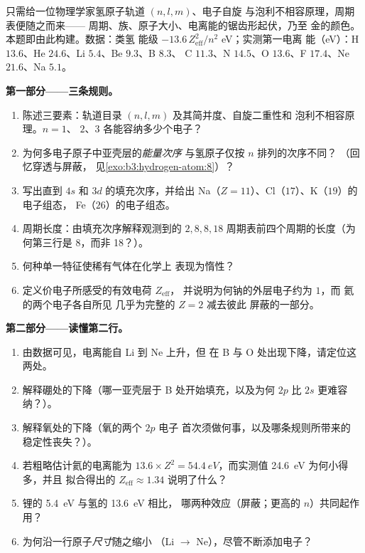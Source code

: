 \begin{problem}\label{pb:b3:identical-particles:1}
只需给一位物理学家氢原子轨道 $(n, l, m)$、电子自旋
与泡利不相容原理，周期表便随之而来——
周期、族、原子大小、电离能的锯齿形起伏，乃至
金的颜色。本题即由此构建。数据：类氢
能级 $-13.6\,Z_{\text{eff}}^2/n^2$ eV；实测第一电离
能（eV）：H $13.6$、He $24.6$、Li $5.4$、Be $9.3$、B $8.3$、
C $11.3$、N $14.5$、O $13.6$、F $17.4$、Ne $21.6$、Na $5.1$。

\medskip\noindent\textbf{第一部分——三条规则。}
\begin{enumerate}
  \item 陈述三要素：轨道目录
        $(n, l, m)$ 及其简并度、自旋二重性和
        泡利不相容原理。$n = 1$、
        $2$、$3$ 各能容纳多少个电子？
  \item 为何多电子原子中亚壳层的\emph{能量次序}
        与氢原子仅按 $n$ 排列的次序不同？
        （回忆穿透与屏蔽，
        见\cref{exo:b3:hydrogen-atom:8}）？
  \item 写出直到 $4s$ 和 $3d$ 的填充次序，并给出
        Na（$Z = 11$）、Cl（$17$）、K（$19$）的电子组态，
        Fe（$26$）的电子组态。
  \item 周期长度：由填充次序解释观测到的 $2, 8, 8, 18$
        周期表前四个周期的长度（为何第三行是
        8，而非 18？）。
  \item 何种单一特征使稀有气体在化学上
        表现为惰性？
  \item 定义价电子所感受的有效电荷 $Z_{\text{eff}}$，
        并说明为何钠的外层电子约为 $1$，而
        氦的两个电子各自所见
        几乎为完整的 $Z = 2$ 减去彼此
        屏蔽的一部分。
\end{enumerate}

\medskip\noindent\textbf{第二部分——读懂第二行。}
\begin{enumerate}[resume]
  \item 由数据可见，电离能自 Li 到 Ne 上升，但
        在 B 与 O 处出现下降，请定位这两处。
  \item 解释硼处的下降（哪一亚壳层于 B 处开始填充，以及为何
        $2p$ 比 $2s$ 更难容纳？）。
  \item 解释氧处的下降（氧的两个 $2p$ 电子
        首次须做何事，以及哪条规则所带来的
        稳定性丧失？）。
  \item 若粗略估计氦的电离能为
        $13.6 \times Z^2 = \qty{54.4}{eV}$，而实测值
        \qty{24.6}{eV} 为何小得多，并且
        拟合得出的 $Z_{\text{eff}} \approx 1.34$ 说明了什么？
  \item 锂的 \qty{5.4}{eV} 与氢的 \qty{13.6}{eV} 相比，
        哪两种效应（屏蔽；更高的 $n$）共同起作用？
  \item 为何沿一行原子\emph{尺寸}随之缩小
        （Li $\to$ Ne），尽管不断添加电子？
\end{enumerate}


\end{problem}
